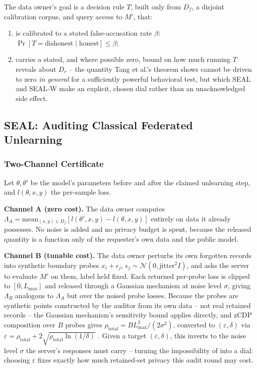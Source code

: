 \documentclass[10pt,journal,compsoc]{IEEEtran}
\begin{document}
The data owner's goal is a decision rule $T$, built only from $D_f$, a disjoint calibration corpus, and query access to $M'$, that:
\begin{enumerate}
\item is calibrated to a stated false-accusation rate $\beta$: $\Pr[T = \text{dishonest} \mid \text{honest}] \le \beta$;
\item carries a stated, and where possible zero, bound on how much running $T$ reveals about $D_r$ -- the quantity Tang et al.'s theorem \cite{tang2026geometric} shows cannot be driven to zero \emph{in general} for a sufficiently powerful behavioral test, but which SEAL and SEAL-W make an explicit, chosen dial rather than an unacknowledged side effect.
\end{enumerate}

\subsection{SEAL: Auditing Classical Federated Unlearning}
\label{sec:seal}

\subsubsection{Two-Channel Certificate}

Let $\theta,\theta'$ be the model's parameters before and after the claimed unlearning step, and $l(\theta,x,y)$ the per-sample loss.

\textbf{Channel A (zero cost).} The data owner computes $\Lambda_A = \text{mean}_{(x,y)\in D_f}\left[l(\theta',x,y) - l(\theta,x,y)\right]$ entirely on data it already possesses. No noise is added and no privacy budget is spent, because the released quantity is a function only of the requester's own data and the public model.

\textbf{Channel B (tunable cost).} The data owner perturbs its own forgotten records into synthetic boundary probes $x_i + \epsilon_j$, $\epsilon_j \sim \mathcal{N}(0,\text{jitter}^2 I)$, and asks the server to evaluate $M'$ on them, label held fixed. Each returned per-probe loss is clipped to $[0,L_{\max}]$ and released through a Gaussian mechanism at noise level $\sigma$, giving $\Lambda_B$ analogous to $\Lambda_A$ but over the noised probe losses. Because the probes are synthetic points constructed by the auditor from its own data -- not real retained records -- the Gaussian mechanism's sensitivity bound applies directly, and zCDP composition over $B$ probes gives $\rho_{\text{total}} = B L_{\max}^2/(2\sigma^2)$, converted to $(\varepsilon,\delta)$ via $\varepsilon = \rho_{\text{total}} + 2\sqrt{\rho_{\text{total}}\ln(1/\delta)}$ \cite{bun2016concentrated}. Given a target $(\varepsilon,\delta)$, this inverts to the noise level $\sigma$ the server's responses must carry -- turning the impossibility of \cite{tang2026geometric} into a dial: choosing $\varepsilon$ fixes exactly how much retained-set privacy this audit round may cost.
\end{document}
